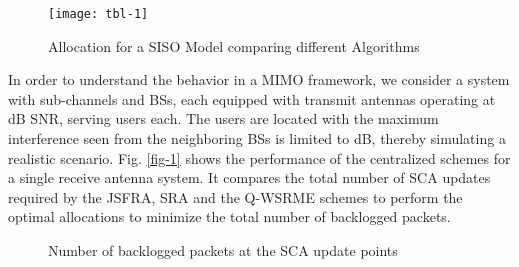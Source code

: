 \begin{figure}
\centering
\texttt{[image: tbl-1]}
\caption{Allocation for a \ac{SISO} Model comparing different Algorithms}
\label{tbl-1}
\end{figure}

In order to understand the behavior in a \ac{MIMO} framework, we consider a system with  sub-channels and  \acp{BS}, each equipped with  transmit antennas operating at dB \ac{SNR}, serving  users each. The users are located with the maximum interference seen from the neighboring \acp{BS} is limited to  dB, thereby simulating a realistic scenario. Fig. \ref{fig-1} shows the performance of the centralized schemes for a single receive antenna system. It compares the total number of \ac{SCA} updates required by the \ac{JSFRA}, \ac{SRA} and the \ac{Q-WSRME} schemes to perform the optimal allocations to minimize the total number of backlogged packets.
\begin{figure*}
\centering
{}
\hfill
{}
\caption{Number of backlogged packets at the \ac{SCA} update points}
\label{fig-a}
\end{figure*}

